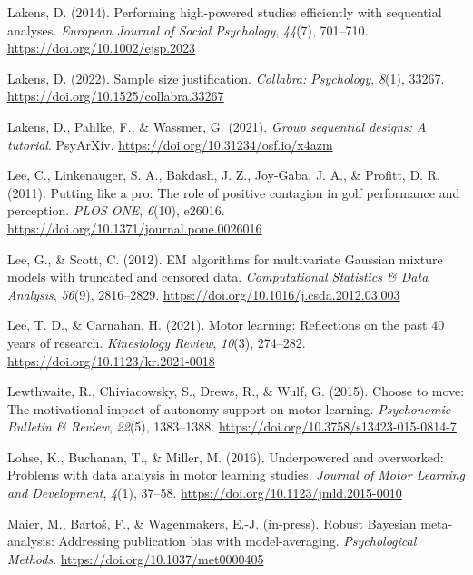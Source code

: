 \documentclass[
  doc, donotrepeattitle,floatsintext]{apa7}
\newlength{\cslhangindent}
\newlength{\cslentryspacingunit} %
\newenvironment{CSLReferences}[2] %
 {%
  \setlength{\parindent}{0pt}
  \ifodd #1
  \let\oldpar\par
  \def\par{\hangindent=\cslhangindent\oldpar}
  \fi
  \setlength{\parskip}{#2\cslentryspacingunit}
 }%
 {}
\begin{document}
\begin{CSLReferences}{1}{0}
\leavevmode{}%
Lakens, D. (2014). Performing high-powered studies efficiently with sequential analyses. \emph{European Journal of Social Psychology}, \emph{44}(7), 701--710. \url{https://doi.org/10.1002/ejsp.2023}

\leavevmode{}%
Lakens, D. (2022). Sample size justification. \emph{Collabra: Psychology}, \emph{8}(1), 33267. \url{https://doi.org/10.1525/collabra.33267}

\leavevmode{}%
Lakens, D., Pahlke, F., \& Wassmer, G. (2021). \emph{Group sequential designs: A tutorial}. {PsyArXiv}. \url{https://doi.org/10.31234/osf.io/x4azm}

\leavevmode{}%
Lee, C., Linkenauger, S. A., Bakdash, J. Z., Joy-Gaba, J. A., \& Profitt, D. R. (2011). Putting like a pro: The role of positive contagion in golf performance and perception. \emph{PLOS ONE}, \emph{6}(10), e26016. \url{https://doi.org/10.1371/journal.pone.0026016}

\leavevmode{}%
Lee, G., \& Scott, C. (2012). {EM} algorithms for multivariate {Gaussian} mixture models with truncated and censored data. \emph{Computational Statistics \& Data Analysis}, \emph{56}(9), 2816--2829. \url{https://doi.org/10.1016/j.csda.2012.03.003}

\leavevmode{}%
Lee, T. D., \& Carnahan, H. (2021). Motor learning: Reflections on the past 40 years of research. \emph{Kinesiology Review}, \emph{10}(3), 274--282. \url{https://doi.org/10.1123/kr.2021-0018}

\leavevmode{}%
Lewthwaite, R., Chiviacowsky, S., Drews, R., \& Wulf, G. (2015). Choose to move: The motivational impact of autonomy support on motor learning. \emph{Psychonomic Bulletin \& Review}, \emph{22}(5), 1383--1388. \url{https://doi.org/10.3758/s13423-015-0814-7}

\leavevmode{}%
Lohse, K., Buchanan, T., \& Miller, M. (2016). Underpowered and overworked: Problems with data analysis in motor learning studies. \emph{Journal of Motor Learning and Development}, \emph{4}(1), 37--58. \url{https://doi.org/10.1123/jmld.2015-0010}

\leavevmode{}%
Maier, M., Bartoš, F., \& Wagenmakers, E.-J. (in-press). Robust {Bayesian} meta-analysis: Addressing publication bias with model-averaging. \emph{Psychological Methods}. \url{https://doi.org/10.1037/met0000405}


\end{CSLReferences}
\end{document}
